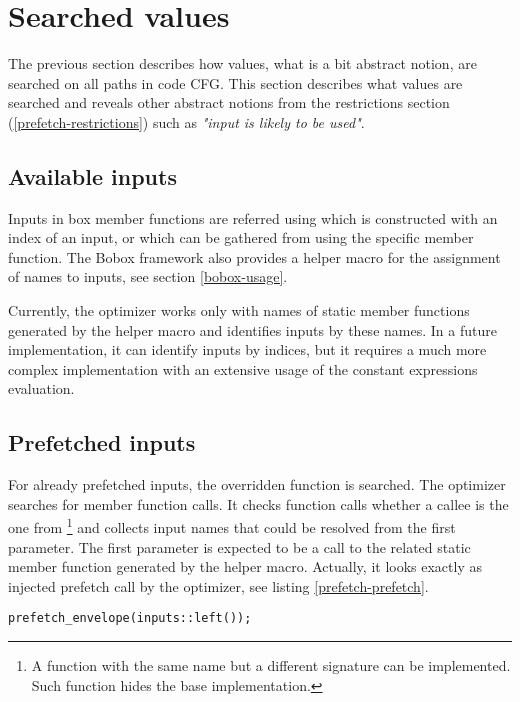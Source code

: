 \section{Searched values}
The previous section describes how values, what is a bit abstract notion, are searched on all paths in code CFG. This section describes what values are searched and reveals other abstract notions from the restrictions section (\ref{prefetch-restrictions}) such as \textit{"input is likely to be used"}.

\subsection{Available inputs}
Inputs in box member functions are referred using  which is constructed with an index of an input, or  which can be gathered from  using the specific  member function. The Bobox framework also provides a helper macro for the assignment of names to inputs, see section \ref{bobox-usage}.

Currently, the optimizer works only with names of static member functions generated by the helper macro and identifies inputs by these names. In a future implementation, it can identify inputs by indices, but it requires a much more complex implementation with an extensive usage of the constant expressions evaluation.

\subsection{Prefetched inputs}
For already prefetched inputs, the overridden  function is searched. The optimizer searches for  member function calls. It checks function calls whether a callee is the one from \footnote{A function with the same name but a different signature can be implemented. Such function hides the base implementation.} and collects input names that could be resolved from the first parameter. The first parameter is expected to be a call to the related static member function generated by the helper macro. Actually, it looks exactly as injected prefetch call by the optimizer, see listing \ref{prefetch-prefetch}.

\begin{lstlisting}[caption={An injected prefetch call for an input called \emph{left}.},label={prefetch-prefetch}]
prefetch_envelope(inputs::left());
\end{lstlisting}

